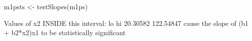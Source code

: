 \begin{Schunk}
\begin{Sinput}
 m1psts <- testSlopes(m1ps)
\end{Sinput}
\begin{Soutput}
Values of x2 INSIDE this interval:
       lo        hi 
 20.30582 122.54847 
cause the slope of (b1 + b2*x2)x1 to be statistically significant
\end{Soutput}
\end{Schunk}
